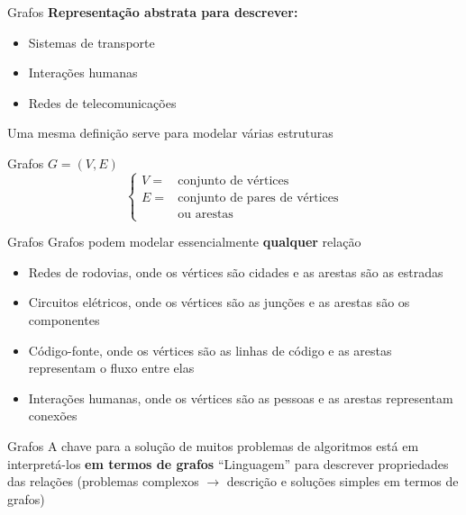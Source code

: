 \documentclass[10pt]{beamer}
\subtitle{Aula 6}
\date{6 de dezembro de 2019}
\begin{document}
\maketitle

\begin{frame}{Grafos}
  \huge
  \textbf{Representação abstrata para descrever:}
  \vfill
  \Large
  \begin{itemize}
    \item Sistemas de transporte
    \item Interações humanas
    \item Redes de telecomunicações
  \end{itemize}
  \vfill
  \large
  Uma mesma definição serve para modelar várias estruturas
\end{frame}

\begin{frame}{Grafos}
  \Huge
  \centering
  $G = (V, E)$
  \vfill
  \LARGE
  \[
    \left\{
      \begin{array}{ll}
        V = & \text{conjunto de vértices}\\
        E = & \text{conjunto de pares de vértices} \\
            & \text{ou arestas}
      \end{array}
    \right.
  \]
\end{frame}

\begin{frame}{Grafos}
  \Large
  Grafos podem modelar essencialmente \textbf{qualquer} relação
  \vfill
  \large
  \begin{itemize}
    \item Redes de rodovias, onde os vértices são cidades e as arestas são as estradas
    \item Circuitos elétricos, onde os vértices são as junções e as arestas são os componentes
    \item Código-fonte, onde os vértices são as linhas de código e as arestas representam o fluxo entre elas
    \item Interações humanas, onde os vértices são as pessoas e as arestas representam conexões
  \end{itemize}
\end{frame}

\begin{frame}{Grafos}
  \huge
  A chave para a solução de muitos problemas de algoritmos está em interpretá-los \textbf{em termos de grafos}
  \vfill
  \large
  ``Linguagem'' para descrever propriedades das relações (problemas complexos $\rightarrow$ descrição e soluções simples em termos de grafos)
\end{frame}
\end{document}
